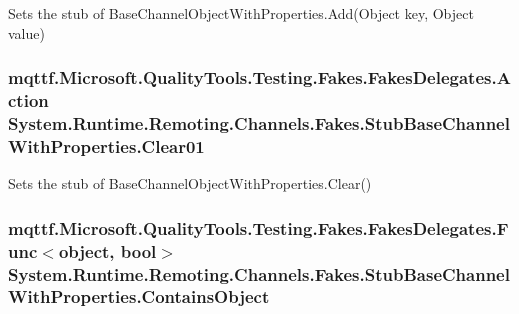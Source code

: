 Sets the stub of Base\-Channel\-Object\-With\-Properties.\-Add(\-Object key, Object value)

\hypertarget{class_system_1_1_runtime_1_1_remoting_1_1_channels_1_1_fakes_1_1_stub_base_channel_with_properties_a83af54fcb4c0308726f0bcdf9d3cd3fc}{
\subsubsection[{Clear01}]{\setlength{\rightskip}{0pt plus 5cm}mqttf.\-Microsoft.\-Quality\-Tools.\-Testing.\-Fakes.\-Fakes\-Delegates.\-Action System.\-Runtime.\-Remoting.\-Channels.\-Fakes.\-Stub\-Base\-Channel\-With\-Properties.\-Clear01}}\label{class_system_1_1_runtime_1_1_remoting_1_1_channels_1_1_fakes_1_1_stub_base_channel_with_properties_a83af54fcb4c0308726f0bcdf9d3cd3fc}


Sets the stub of Base\-Channel\-Object\-With\-Properties.\-Clear()

\hypertarget{class_system_1_1_runtime_1_1_remoting_1_1_channels_1_1_fakes_1_1_stub_base_channel_with_properties_a16eb4fb4e90c20d6fabd2b694e95e151}{
\subsubsection[{Contains\-Object}]{\setlength{\rightskip}{0pt plus 5cm}mqttf.\-Microsoft.\-Quality\-Tools.\-Testing.\-Fakes.\-Fakes\-Delegates.\-Func$<$object, bool$>$ System.\-Runtime.\-Remoting.\-Channels.\-Fakes.\-Stub\-Base\-Channel\-With\-Properties.\-Contains\-Object}}\label{class_system_1_1_runtime_1_1_remoting_1_1_channels_1_1_fakes_1_1_stub_base_channel_with_properties_a16eb4fb4e90c20d6fabd2b694e95e151}


